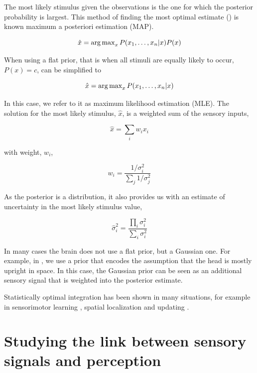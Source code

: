 The most likely stimulus given the observations is  the one for which the posterior probability is largest. This method of finding the most optimal estimate () is known maximum a posteriori estimation (MAP).

\begin{equation}
\hat{x} = \operatorname{arg\,max}_x P(x_1,\dotsc,x_n|x)P(x)
\label{intro:eq:map}
\end{equation}

When using a flat prior, that is when all stimuli are equally likely to occur, $P(x)=c$,  can be simplified to

\begin{equation}
\hat{x} = \operatorname{arg\,max}_x P(x_1,\dotsc,x_n|x)
\label{intro:eq:mle}
\end{equation}

In this case, we refer to it as maximum likelihood estimation (MLE). The solution for the most likely stimulus, $\hat{x}$, is a weighted sum of the sensory inputs,

\begin{equation}
\hat{x}=\sum_i w_i x_i
\end{equation}

with weight, $w_i$,

\begin{equation}
w_i = \frac{1/\sigma^2_i}{\sum_j 1/\sigma^2_j}
\end{equation}

As the posterior is a distribution, it also provides us with an estimate of uncertainty in  the most likely stimulus value,

\begin{equation}
\hat{\sigma}^2_i = \frac{\prod_i \sigma^2_i}{\sum_i \sigma^2_i}
\end{equation}

In many cases the brain does not use a flat prior, but a Gaussian one. For example, in , we use a prior that encodes the assumption that the head is mostly upright in space. In this case, the Gaussian prior can be seen as an additional sensory signal that is weighted into the posterior estimate.

Statistically optimal integration has been shown in many situations, for example in sensorimotor learning \cite{kording2004}, spatial localization \cite{battaglia2003} and updating \cite{vaziri2006}.


\section{Studying the link between sensory signals and perception}

